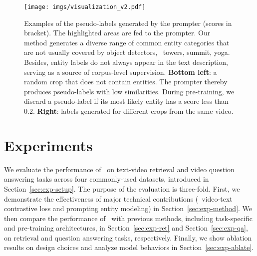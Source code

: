 \documentclass[10pt,twocolumn,letterpaper]{article}
\begin{document}
\begin{table*}[htb]
{\begin{tabular}
	
		\bottomrule
	\end{tabular}}
\vspace{-5pt}
	\caption
	{Evaluations of the proposed pre-training objectives on four downstream datasets. MLM: masked language modeling loss. VTM: video-text matching loss. PEM: prompting entity modeling loss. VTC: video-text contrastive loss. 
	R@k denotes recall (\%) with k retrieval efforts; MdR denotes median ranking for retrieved videos. We use acc. to denote accuracy.
	}
	\label{tbl:main}


\end{table*}		 \begin{figure*}[ht]
\centering
  \texttt{[image: imgs/visualization\_v2.pdf]}
\vspace{-15pt}
\caption{Examples of the pseudo-labels generated by the prompter (scores in bracket). The highlighted areas are fed to the prompter. Our method generates a diverse range of common entity categories that are not usually covered by object detectors, \eg~towers, summit, yoga.
Besides, entity labels do not always appear in the text description, serving as a source of corpus-level supervision.
\textbf{Bottom left}: a random crop that does not contain entities. The prompter thereby produces pseudo-labels with low similarities. During pre-training, we discard a pseudo-label if its most likely entity has a score less than 0.2. \textbf{Right}: labels generated for different crops from the same video.}
\label{fig:plabel}
\vspace{-3.5ex}

\end{figure*}
 \vspace{-0.5ex}
\section{Experiments}
\vspace{-0.5ex}
We evaluate the performance of \name~on text-video retrieval and video question answering tasks across four commonly-used datasets, introduced in Section~\ref{sec:exp-setup}.
The purpose of the evaluation is three-fold. First, we demonstrate the effectiveness of major technical contributions (\ie~video-text contrastive loss and prompting entity modeling) in Section~\ref{sec:exp-method}.
We then compare the performance of \name~with previous methods, including task-specific and pre-training architectures, in Section~\ref{sec:exp-ret} and Section~\ref{sec:exp-qa}, on retrieval and question answering tasks, respectively.
Finally, we show ablation results on design choices and analyze model behaviors in Section~\ref{sec:exp-ablate}.
\end{document}
